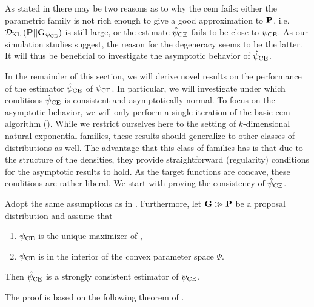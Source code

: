 As stated in \citep{Chan2012Improved} there may be two reasons as to why the \acrshort{cem} fails: either the parametric family is not rich enough to give a good approximation to $\P$, i.e. $ \Dkl{\P}{\G_{\pce}}$ is still large, or the estimate $\hpce$ fails to be close to $\pce$. As our simulation studies  suggest, the reason for the degeneracy seems to be the latter. It will thus be beneficial to investigate the asymptotic behavior of $\hpce$. 

In the remainder of this section, we will derive novel results on the performance of the estimator $\hpce$ of $\pce$. In particular, we will investigate under which conditions $\hpce$ is consistent and asymptotically normal. To focus on the asymptotic behavior, we will only perform a single iteration of the basic \acrshort{cem} algorithm (). While we restrict ourselves here to the setting of $k$-dimensional natural exponential families, these results should generalize to other classes of distributions as well. The advantage that this class of families has is that due to the structure of the densities, they provide straightforward (regularity) conditions for the asymptotic results to hold. As the target functions are concave, these conditions are rather liberal. We start with proving the consistency of $\hpce$. 

\begin{theorem}
    \label{thm:cem-consistent}
    Adopt the same assumptions as in . Furthermore, let $\G \gg \P$ be a proposal distribution and assume that
    
    \begin{enumerate}
        \item $\pce$ is the unique maximizer of ,
        \item $\pce$ is in the interior of the convex parameter space $\Psi$.
    \end{enumerate}
    
   Then $\hpce$ is a strongly consistent estimator of $\pce$.
\end{theorem}

The proof is based on the following theorem of \citeauthor{Haberman1989Concavity}.

